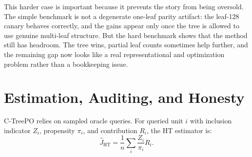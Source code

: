 \documentclass[11pt]{article}
\begin{document}
\begin{table}[t]
    \centering
    \small
    \caption{Hard structural benchmark summary. The tree keeps a large edge over the flat FNO, but the residual difficulty gap is real and the partial-leaf-count advantage is less uniform than in the recoverable four-regime case.}
    \label{tab:structural-markov}
\end{table}

This harder case is important because it prevents the story from being oversold. The simple benchmark is not a degenerate one-leaf parity artifact: the leaf-128 canary behaves correctly, and the gains appear only once the tree is allowed to use genuine multi-leaf structure. But the hard benchmark shows that the method still has headroom. The tree wins, partial leaf counts sometimes help further, and the remaining gap now looks like a real representational and optimization problem rather than a bookkeeping issue.

\section{Estimation, Auditing, and Honesty}\label{sec:estimation}

C-TreePO relies on sampled oracle queries.
For queried unit $i$ with inclusion indicator $Z_i$, propensity $\pi_i$, and contribution $R_i$, the HT estimator is:
\[
\hat{J}_{\mathrm{HT}} = \frac{1}{n}\sum_i \frac{Z_i}{\pi_i}R_i.
\]
\end{document}
